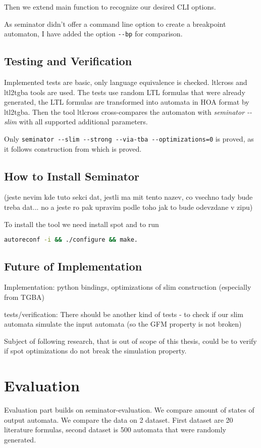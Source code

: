 \documentclass[
	digital
nolof, nolot
]{fithesis3}
\begin{document}
	Then we extend main function to recognize our desired CLI options.
	
	As seminator didn't offer a command line option to create a breakpoint automaton, I have added the option \texttt{-{}-bp} for comparison.
	
	
	
	\section{Testing and Verification}
	Implemented tests are basic, only language equivalence is checked.
	ltlcross and ltl2tgba tools are used. The tests use random LTL formulas that were already generated, the LTL formulas are transformed into automata in HOA format by ltl2tgba.
	Then the tool ltlcross cross-compares the automaton with \emph{seminator -{}-slim} with all supported additional parameters.
	
	Only \texttt{seminator -{}-slim -{}-strong -{}-via-tba -{}-optimizations=0} is proved, as it follows construction from \cite{hlavni} which is proved.
	
	
	\section{How to Install Seminator}
	(jeste nevim kde tuto sekci dat, jestli ma mit tento nazev, co vsechno tady bude treba dat... no a jeste ro pak upravim podle toho jak to bude odevzdane v zipu)
	
	To install the tool we need install spot and to run 
	
	\begin{lstlisting}[language=bash]
autoreconf -i && ./configure && make.
	\end{lstlisting}
	\section{Future of Implementation}
	Implementation:
	python bindings, optimizations of slim construction (especially from TGBA)
	
	
	
	tests/verification:
	There should be another kind of tests - to check if our slim automata simulate the input automata (so the GFM property is not broken)
	
	Subject of following research, that is out of scope of this thesis, could be to verify if spot optimizations do not break the simulation property. 
	
	\chapter{Evaluation}
	Evaluation part builds on seminator-evaluation. We compare amount of states of output automata. We compare the data on 2 dataset. First dataset are 20 literature formulas, second dataset is 500 automata that were randomly generated.
	
\end{document}
